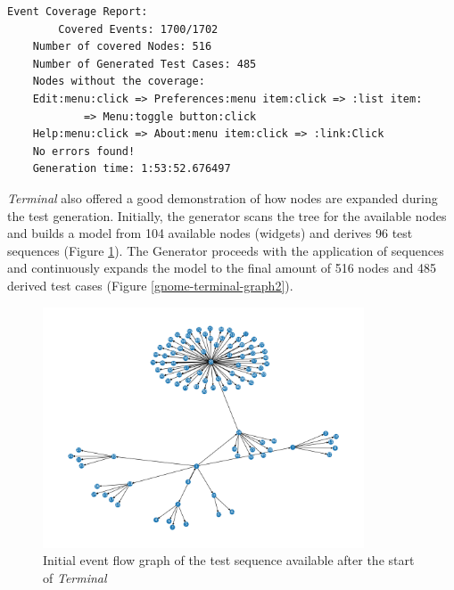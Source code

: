 \begin{lstlisting}[caption={Final test generator report},label={gnome-terminal-report}]
    Event Coverage Report:
        Covered Events: 1700/1702
    Number of covered Nodes: 516
    Number of Generated Test Cases: 485 
    Nodes without the coverage:
    Edit:menu:click => Preferences:menu item:click => :list item: 
            => Menu:toggle button:click
    Help:menu:click => About:menu item:click => :link:Click
    No errors found!
    Generation time: 1:53:52.676497
\end{lstlisting}

\textit{Terminal} also offered a good demonstration of how nodes are expanded during the test generation. Initially, the generator scans the tree for the available nodes and builds a model from 104 available nodes (widgets) and derives 96 test sequences (Figure \ref{gnome-terminal-graph1}). The Generator proceeds with the application of sequences and continuously expands the model to the final amount of 516 nodes and 485 derived test cases (Figure \ref{gnome-terminal-graph2}).

\begin{figure}[H]
	\centering
	\includegraphics[width=0.85\textwidth,clip]{obrazky-figures/gnome-terminal_n_start.png}
	\caption{Initial event flow graph of the test sequence available after the start of \textit{Terminal}}
	\label{gnome-terminal-graph1}
\end{figure}

